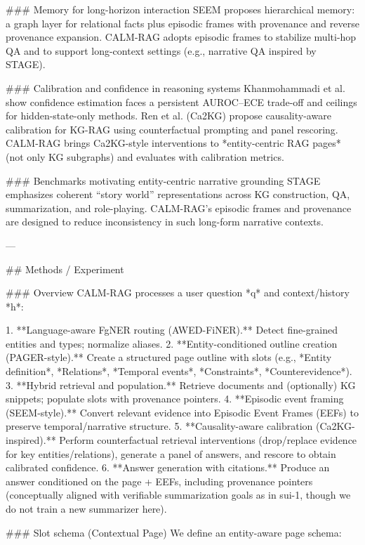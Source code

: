 ### Memory for long-horizon interaction  
SEEM proposes hierarchical memory: a graph layer for relational facts plus episodic frames with provenance and reverse provenance expansion. CALM-RAG adopts episodic frames to stabilize multi-hop QA and to support long-context settings (e.g., narrative QA inspired by STAGE).

### Calibration and confidence in reasoning systems  
Khanmohammadi et al. show confidence estimation faces a persistent AUROC–ECE trade-off and ceilings for hidden-state-only methods. Ren et al. (Ca2KG) propose causality-aware calibration for KG-RAG using counterfactual prompting and panel rescoring. CALM-RAG brings Ca2KG-style interventions to *entity-centric RAG pages* (not only KG subgraphs) and evaluates with calibration metrics.

### Benchmarks motivating entity-centric narrative grounding  
STAGE emphasizes coherent “story world” representations across KG construction, QA, summarization, and role-playing. CALM-RAG’s episodic frames and provenance are designed to reduce inconsistency in such long-form narrative contexts.

---

## Methods / Experiment  

### Overview  
CALM-RAG processes a user question *q* and context/history *h*:

1. **Language-aware FgNER routing (AWED-FiNER).** Detect fine-grained entities and types; normalize aliases.
2. **Entity-conditioned outline creation (PAGER-style).** Create a structured page outline with slots (e.g., *Entity definition*, *Relations*, *Temporal events*, *Constraints*, *Counterevidence*).
3. **Hybrid retrieval and population.** Retrieve documents and (optionally) KG snippets; populate slots with provenance pointers.
4. **Episodic event framing (SEEM-style).** Convert relevant evidence into Episodic Event Frames (EEFs) to preserve temporal/narrative structure.
5. **Causality-aware calibration (Ca2KG-inspired).** Perform counterfactual retrieval interventions (drop/replace evidence for key entities/relations), generate a panel of answers, and rescore to obtain calibrated confidence.
6. **Answer generation with citations.** Produce an answer conditioned on the page + EEFs, including provenance pointers (conceptually aligned with verifiable summarization goals as in sui-1, though we do not train a new summarizer here).

### Slot schema (Contextual Page)  
We define an entity-aware page schema:

